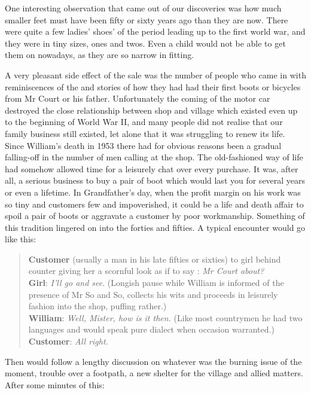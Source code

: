 One interesting observation that came out of our discoveries was how much smaller feet must have been fifty or sixty years ago than they are now. There were quite a few ladies' shoes' of the period leading up to the first world war, and they were in tiny sizes, ones and twos. Even a child would not be able to get them on nowadays, as they are so narrow in fitting.

A very pleasant side effect of the sale was the number of people who came in with reminiscences of the  and stories of how they had had their first boots or bicycles from Mr Court or his father. Unfortunately the coming of the motor car destroyed the close relationship between shop and village which existed even up to the beginning of World War II, and many people did not realise that our family business still existed, let alone that it was struggling to renew its life. Since William's death in 1953 there had for obvious reasons been a gradual falling-off in the number of men calling at the shop. The old-fashioned way of life had somehow allowed time for a leisurely chat over every purchase. It was, after all, a serious business to buy a pair of boot which would last you for several years or even a lifetime. In Grandfather's day, when the profit margin on his work was so tiny and customers few and impoverished, it could be a life and death affair to spoil a pair of boots or aggravate a customer by poor workmanship. Something of this tradition lingered on into the forties and fifties. A typical encounter would go like this:

\begin{quote}
\textbf{Customer} (usually a man in his late fifties or sixties) to girl behind counter giving her a scornful look as if to say : \textit{Mr Court about?} \\
\textbf{Girl}: \textit{I'll go and see}. (Longish pause while William is informed of the presence of Mr So and So, collects his wits and proceeds in leisurely fashion into the shop, puffing rather.) \\
\textbf{William}: \textit{Well, Mister, how is it then.} (Like most countrymen he had two languages and would speak pure dialect when occasion warranted.) \\
\textbf{Customer}: \textit{All right.}
\end{quote}

Then would follow a lengthy discussion on whatever was the burning issue of the moment, trouble over a footpath, a new shelter for the village  and allied matters. After some minutes of this:


